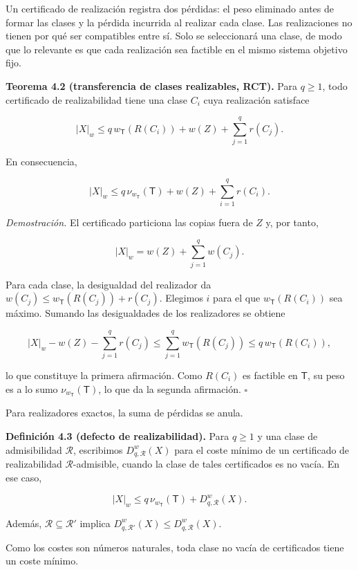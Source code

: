 \documentclass[spanish,11pt,a4paper]{article}
\begin{document}
Un certificado de realización registra dos pérdidas: el peso eliminado
antes de formar las clases y la pérdida incurrida al realizar cada
clase. Las realizaciones no tienen por qué ser compatibles entre sí.
Solo se seleccionará una clase, de modo que lo relevante es que cada
realización sea factible en el mismo sistema objetivo fijo.

\textbf{Teorema 4.2 (transferencia de clases realizables, RCT).} Para
\(q\ge1\), todo certificado de realizabilidad tiene una clase \(C_i\)
cuya realización satisface

\[
|X|_w\le q\,w_{\mathsf T}(R(C_i))+w(Z)+\sum_{j=1}^q r(C_j).
\]

En consecuencia,

\[
|X|_w\le q\,\nu_{w_{\mathsf T}}(\mathsf T)+w(Z)+\sum_{i=1}^q r(C_i).
\]

\emph{Demostración.} El certificado particiona las copias fuera de \(Z\)
y, por tanto,

\[
|X|_w=w(Z)+\sum_{j=1}^q w(C_j).
\]

Para cada clase, la desigualdad del realizador da
\(w(C_j)\le w_{\mathsf T}(R(C_j))+r(C_j)\). Elegimos \(i\) para el que
\(w_{\mathsf T}(R(C_i))\) sea máximo. Sumando las desigualdades de los
realizadores se obtiene

\[
|X|_w-w(Z)-\sum_{j=1}^q r(C_j)
\le \sum_{j=1}^q w_{\mathsf T}(R(C_j))
\le q\,w_{\mathsf T}(R(C_i)),
\]

lo que constituye la primera afirmación. Como \(R(C_i)\) es factible en
\(\mathsf T\), su peso es a lo sumo \(\nu_{w_{\mathsf T}}(\mathsf T)\),
lo que da la segunda afirmación. \(\square\)

Para realizadores exactos, la suma de pérdidas se anula.

\textbf{Definición 4.3 (defecto de realizabilidad).} Para \(q\ge1\) y
una clase de admisibilidad \(\mathcal R\), escribimos
\(D^w_{q,\mathcal R}(X)\) para el coste mínimo de un certificado de
realizabilidad \(\mathcal R\)-admisible, cuando la clase de tales
certificados es no vacía. En ese caso,

\[
|X|_w\le q\,\nu_{w_{\mathsf T}}(\mathsf T)+D^w_{q,\mathcal R}(X).
\]

Además, \(\mathcal R\subseteq\mathcal R'\) implica
\(D^w_{q,\mathcal R'}(X)\le D^w_{q,\mathcal R}(X)\).

Como los costes son números naturales, toda clase no vacía de
certificados tiene un coste mínimo.
\end{document}
